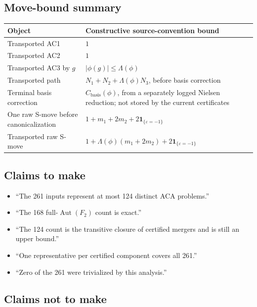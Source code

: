 \documentclass[11pt]{article}
\theoremstyle{definition}
\theoremstyle{remark}
\newcommand{\F}{F_2}
\newcommand{\Aut}{\operatorname{Aut}}
\newcommand{\len}[1]{\left|#1\right|}
\newcommand{\eps}{\varepsilon}
\begin{document}
\subsection{Move-bound summary}

\begin{center}
\begin{tabularx}{\textwidth}{X X}
\toprule
Object & Constructive source-convention bound\\
\midrule
Transported AC1 & \(1\)\\
Transported AC2 & \(1\)\\
Transported AC3 by \(g\) & \(\len{\phi(g)}\le\Lambda(\phi)\)\\
Transported path & \(N_1+N_2+\Lambda(\phi)N_3\), before basis correction\\
Terminal basis correction &
\(C_{\mathrm{basis}}(\phi)\), from a separately logged Nielsen reduction;
not stored by the current certificates\\
One raw S-move before canonicalization &
\(1+m_1+2m_2+2\mathbf1_{\{\eps=-1\}}\)\\
Transported raw S-move &
\(1+\Lambda(\phi)(m_1+2m_2)+2\mathbf1_{\{\eps=-1\}}\)\\
\bottomrule
\end{tabularx}
\end{center}

\subsection{Claims to make}

\begin{itemize}
  \item ``The 261 inputs represent at most 124 distinct ACA problems.''
  \item ``The 168 full-\(\Aut(\F)\) count is exact.''
  \item ``The 124 count is the transitive closure of certified mergers and
  is still an upper bound.''
  \item ``One representative per certified component covers all 261.''
  \item ``Zero of the 261 were trivialized by this analysis.''
\end{itemize}

\subsection{Claims not to make}
\end{document}
